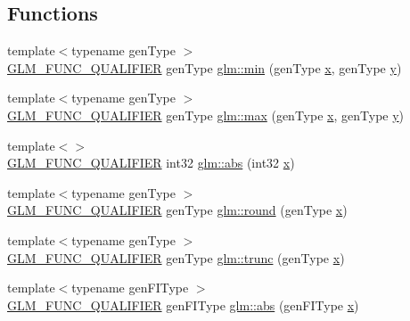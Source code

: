 \subsection*{Functions}
\begin{DoxyCompactItemize}
\item 
{\footnotesize template$<$typename gen\+Type $>$ }\\\mbox{\hyperlink{setup_8hpp_a33fdea6f91c5f834105f7415e2a64407}{G\+L\+M\+\_\+\+F\+U\+N\+C\+\_\+\+Q\+U\+A\+L\+I\+F\+I\+ER}} gen\+Type \mbox{\hyperlink{group__core__func__common_ga2c2bde1cec025b7ddff83c74a1113719}{glm\+::min}} (gen\+Type \mbox{\hyperlink{glad_8h_a92d0386e5c19fb81ea88c9f99644ab1d}{x}}, gen\+Type \mbox{\hyperlink{glad_8h_a66ddd433d2cacfe27f5906b7e86faeed}{y}})
\item 
{\footnotesize template$<$typename gen\+Type $>$ }\\\mbox{\hyperlink{setup_8hpp_a33fdea6f91c5f834105f7415e2a64407}{G\+L\+M\+\_\+\+F\+U\+N\+C\+\_\+\+Q\+U\+A\+L\+I\+F\+I\+ER}} gen\+Type \mbox{\hyperlink{group__core__func__common_ga98caa7f95a94c86a86ebce893a45326c}{glm\+::max}} (gen\+Type \mbox{\hyperlink{glad_8h_a92d0386e5c19fb81ea88c9f99644ab1d}{x}}, gen\+Type \mbox{\hyperlink{glad_8h_a66ddd433d2cacfe27f5906b7e86faeed}{y}})
\item 
{\footnotesize template$<$$>$ }\\\mbox{\hyperlink{setup_8hpp_a33fdea6f91c5f834105f7415e2a64407}{G\+L\+M\+\_\+\+F\+U\+N\+C\+\_\+\+Q\+U\+A\+L\+I\+F\+I\+ER}} int32 \mbox{\hyperlink{namespaceglm_a297722642f818493a6e4b02f4cf7781b}{glm\+::abs}} (int32 \mbox{\hyperlink{glad_8h_a92d0386e5c19fb81ea88c9f99644ab1d}{x}})
\item 
{\footnotesize template$<$typename gen\+Type $>$ }\\\mbox{\hyperlink{setup_8hpp_a33fdea6f91c5f834105f7415e2a64407}{G\+L\+M\+\_\+\+F\+U\+N\+C\+\_\+\+Q\+U\+A\+L\+I\+F\+I\+ER}} gen\+Type \mbox{\hyperlink{namespaceglm_a63066719f14195375ae55b9770460301}{glm\+::round}} (gen\+Type \mbox{\hyperlink{glad_8h_a92d0386e5c19fb81ea88c9f99644ab1d}{x}})
\item 
{\footnotesize template$<$typename gen\+Type $>$ }\\\mbox{\hyperlink{setup_8hpp_a33fdea6f91c5f834105f7415e2a64407}{G\+L\+M\+\_\+\+F\+U\+N\+C\+\_\+\+Q\+U\+A\+L\+I\+F\+I\+ER}} gen\+Type \mbox{\hyperlink{namespaceglm_a1bd4a73a4a1f73950597df2f67c01c43}{glm\+::trunc}} (gen\+Type \mbox{\hyperlink{glad_8h_a92d0386e5c19fb81ea88c9f99644ab1d}{x}})
\item 
{\footnotesize template$<$typename gen\+F\+I\+Type $>$ }\\\mbox{\hyperlink{setup_8hpp_a33fdea6f91c5f834105f7415e2a64407}{G\+L\+M\+\_\+\+F\+U\+N\+C\+\_\+\+Q\+U\+A\+L\+I\+F\+I\+ER}} gen\+F\+I\+Type \mbox{\hyperlink{namespaceglm_a20ebe8867152652a4830a35894b5ab33}{glm\+::abs}} (gen\+F\+I\+Type \mbox{\hyperlink{glad_8h_a92d0386e5c19fb81ea88c9f99644ab1d}{x}})

\end{DoxyCompactItemize}
